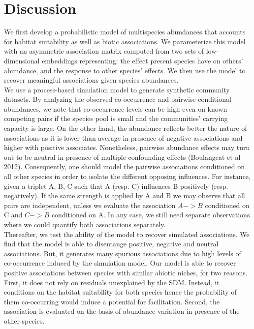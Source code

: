 \documentclass[10pt,a4paper]{article}
\begin{document}
\section{Discussion}
We first develop a probabilistic model of multispecies abundances that accounts for habitat suitability as well as biotic associations. We parameterize this model with an asymmetric association matrix computed from two sets of low-dimensional embeddings representing: the effect present species have on others' abundance, and the response to other species' effects. We then use the model to recover meaningful associations given species abundances. \\

We use a process-based simulation model to generate synthetic community datasets. By analyzing the observed co-occurrence and pairwise conditional abundances, we note that co-occurrence levels can be high even on known competing pairs if the species pool is small and the communities' carrying capacity is large. On the other hand, the abundance reflects better the nature of associations as it is lower than average in presence of negative associations and higher with positive associates. Nonetheless, pairwise abundance effects may turn out to be neutral in presence of multiple confounding effects (Boulangeat et al 2012). Consequently, one should model the pairwise associations conditioned on all other species in order to isolate the different opposing influences. For instance, given a triplet A, B, C such that A (resp. C) influences B positively (resp. negatively). If the same strength is applied by A and B we may observe that all pairs are independent, unless we evaluate the association $ A -> B $ conditioned on C and $C -> B$ conditioned on A. In any case, we still need separate observations where we could quantify both associations separately. \\

Thereafter, we test the ability of the model to recover simulated associations. We find that the model is able to disentange positive, negative and neutral associations. But, it generates many spurious associations due to high levels of co-occurrence induced by the simulation model. Our model is able to recover positive associations between species with similar abiotic niches, for two reasons. First, it does not rely on residuals unexplained by the SDM. Instead, it conditions on the habitat suitability for both species hence the probability of them co-occurring would induce a potential for facilitation. Second, the association is evaluated on the basis of abundance variation in presence of the other species. \\ 
\end{document}

